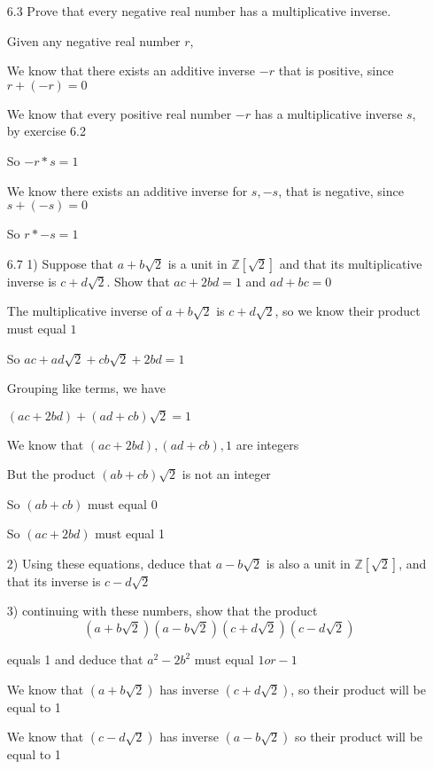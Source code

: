 \documentclass[11pt]{article}
\begin{document}
\begin{itemize}

\newpage
\item[6.3]
	Prove that every negative real number has a multiplicative inverse.

	Given any negative real number $r$,

	We know that there exists an additive inverse $-r$ that is positive, since $r + (-r) = 0$

	We know that every positive real number $-r$ has a multiplicative inverse $s$, by exercise 6.2

	So $-r * s = 1$

	We know there exists an additive inverse for $s, -s$, that is negative, since $s + (-s) = 0$

	So $r * -s = 1$

\newpage
\item[6.7]
	1) Suppose that $a + b\sqrt{2}$ is a unit in $\mathbb{Z}[\sqrt{2}]$ and that its multiplicative inverse is $c + d\sqrt{2}$. Show that $ac + 2bd = 1$ and $ad + bc = 0$

	The multiplicative inverse of $a + b\sqrt{2}$ is $c + d\sqrt{2}$, so we know their product must equal $1$

	So $ac + ad\sqrt{2} + cb\sqrt{2} + 2bd = 1$

	Grouping like terms, we have 

	$(ac + 2bd) + (ad + cb)\sqrt{2} = 1$

	We know that $(ac + 2bd), (ad + cb), 1$ are integers

	But the product $(ab + cb)\sqrt{2}$ is not an integer

	So $(ab + cb)$ must equal 0

	So $(ac + 2bd)$ must equal 1

	2) Using these equations, deduce that $a - b\sqrt{2}$ is also a unit in $\mathbb{Z}[\sqrt{2}]$, and that its inverse is $c - d\sqrt{2}$

	

	3) continuing with these numbers, show that the product $$(a + b\sqrt{2})(a - b\sqrt{2})(c + d\sqrt{2})(c - d\sqrt{2})$$

	equals 1 and deduce that $a^2 - 2b^2$ must equal $1 or -1$

	We know that $(a + b\sqrt{2})$ has inverse $(c + d\sqrt{2})$, so their product will be equal to 1

	We know that $(c - d\sqrt{2})$ has inverse $(a - b\sqrt{2})$ so their product will be equal to 1


\end{itemize}
\end{document}

